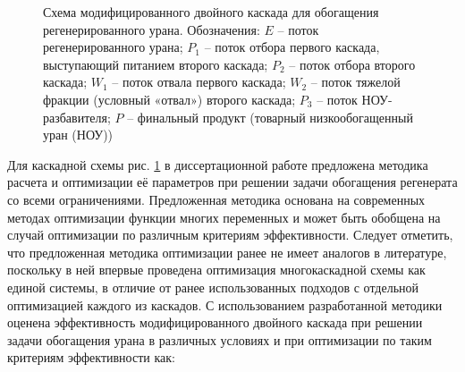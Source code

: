 \begin{figure}[ht]
  \caption{Схема модифицированного двойного каскада для обогащения регенерированного урана. Обозначения: $E$ -- поток регенерированного урана; $P_1$ -- поток отбора первого каскада, выступающий питанием второго каскада; $P_2$ -- поток отбора второго каскада; $W_1$ -- поток отвала первого каскада; $W_2$ -- поток тяжелой фракции (условный «отвал») второго каскада; $P_3$ -- поток НОУ-разбавителя; $P$ -- финальный продукт (товарный низкообогащенный уран (НОУ))}\label{p2left_autoref}
\end{figure}

Для каскадной схемы рис. \ref{p2left_autoref} в диссертационной работе предложена методика расчета и оптимизации её параметров при решении задачи обогащения регенерата со всеми ограничениями. Предложенная методика основана на современных методах оптимизации функции многих переменных и может быть обобщена на случай оптимизации по различным критериям эффективности. Следует отметить, что предложенная методика оптимизации ранее не имеет аналогов в литературе, поскольку в ней впервые проведена оптимизация многокаскадной схемы как единой системы, в отличие от ранее использованных подходов с отдельной оптимизацией каждого из каскадов. С использованием разработанной методики оценена эффективность модифицированного двойного каскада при решении задачи обогащения урана в различных условиях и при оптимизации по таким критериям эффективности как:

